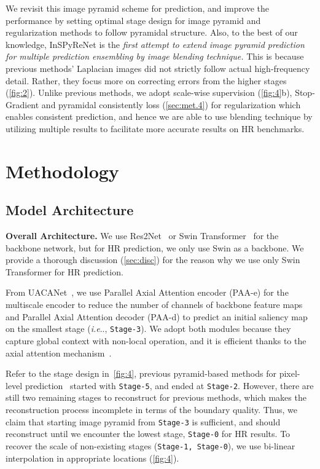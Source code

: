 \documentclass{llncs}
\makeatletter
\DeclareRobustCommand\onedot{\futurelet\@let@token\@onedot}
\def\@onedot{\ifx\@let@token.\else.\null\fi\xspace}
\def\ie{\emph{i.e}\onedot} \def\Ie{\emph{I.e}\onedot}
\makeatother
\begin{document}
We revisit this image pyramid scheme for prediction, and improve the performance by setting optimal stage design for image pyramid and regularization methods to follow pyramidal structure.
Also, to the best of our knowledge, InSPyReNet is the \textit{first attempt to extend image pyramid prediction for multiple prediction ensembling by image blending technique.} 
This is because previous methods' Laplacian images did not strictly follow actual high-frequency detail. Rather, they focus more on correcting errors from the higher stages (\cref{fig:2}).
Unlike previous methods, we adopt scale-wise supervision (\cref{fig:4}b), Stop-Gradient and pyramidal consistently loss (\cref{sec:met.4}) for regularization which enables consistent prediction, 
and hence we are able to use blending technique by utilizing multiple results to facilitate more accurate results on HR benchmarks. \section{Methodology}
\label{sec:met}

    \subsection{Model Architecture}
        \noindent
        \textbf{Overall Architecture.} We use Res2Net~\cite{gao2019res2net} or Swin Transformer~\cite{liu2021swin} for the backbone network, but for HR prediction, we only use Swin as a backbone.
        We provide a thorough discussion (\cref{sec:disc}) for the reason why we use only Swin Transformer for HR prediction.

        From UACANet~\cite{kim2021uacanet}, we use Parallel Axial Attention encoder (PAA-e) for the multiscale encoder to reduce the number of channels of backbone feature maps 
        and Parallel Axial Attention decoder (PAA-d) to predict an initial saliency map on the smallest stage (\ie, \texttt{Stage-3}).
        We adopt both modules because they capture global context with non-local operation, and it is efficient thanks to the axial attention mechanism~\cite{ho2019axial,wang2020axial}.
        
        Refer to the stage design in~\cref{fig:4}, previous pyramid-based methods for pixel-level prediction~\cite{ghiasi2016laplacian,chen2018reverse} started with \texttt{Stage-5}, and ended at \texttt{Stage-2}. 
        However, there are still two remaining stages to reconstruct for previous methods, which makes the reconstruction process incomplete in terms of the boundary quality. 
        Thus, we claim that starting image pyramid from \texttt{Stage-3} is sufficient, and should reconstruct until we encounter the lowest stage, \texttt{Stage-0} for HR results.
        To recover the scale of non-existing stages (\texttt{Stage-1, Stage-0}), we use bi-linear interpolation in appropriate locations (\cref{fig:4}).
\end{document}
